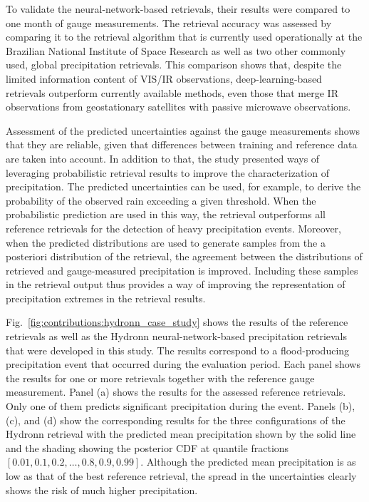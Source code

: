 To validate the neural-network-based retrievals, their results were compared to
one month of gauge measurements. The retrieval accuracy was assessed by
comparing it to the retrieval algorithm that is currently used operationally at
the Brazilian National Institute of Space Research as well as two other
commonly used, global precipitation retrievals. This comparison shows that,
despite the limited information content of VIS/IR observations,
deep-learning-based retrievals outperform currently available methods, even
those that merge IR observations from geostationary satellites with passive
microwave observations.

Assessment of the predicted uncertainties against the gauge measurements shows
that they are reliable, given that differences between training  and reference
 data are taken into account. In addition to that, the study presented ways
of leveraging probabilistic retrieval results to improve the characterization of
precipitation. The predicted uncertainties can be used, for example, to derive
the probability of the observed rain exceeding a given threshold. When the
probabilistic prediction are used in this way, the retrieval  outperforms
all reference retrievals for the detection of heavy precipitation events.
Moreover, when the predicted distributions are used to generate samples from the
a posteriori distribution of the retrieval, the agreement between the
distributions of retrieved and gauge-measured precipitation is improved.
Including these samples in the retrieval output thus provides a way of improving
the representation of precipitation extremes in the retrieval results.

Fig.~\ref{fig:contributions:hydronn_case_study} shows the results of the reference retrievals
as well as the Hydronn neural-network-based precipitation retrievals that were
developed in this study. The results correspond to a flood-producing
precipitation event that occurred during the evaluation period. Each panel shows
the results for one or more retrievals together with the reference gauge
measurement. Panel (a) shows the results for the assessed reference retrievals.
Only one of them predicts significant precipitation during the event. Panels
(b), (c), and (d) show the corresponding results for the three configurations of
the Hydronn retrieval with the predicted mean precipitation shown by the solid
line and the shading showing the posterior CDF at quantile fractions $[0.01,
  0.1, 0.2, \ldots, 0.8, 0.9, 0.99]$. Although the predicted mean precipitation
is as low as that of the best reference retrieval, the spread in the
uncertainties clearly shows the risk of much higher precipitation.

